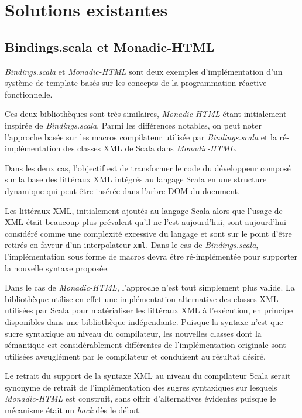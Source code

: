 \section{Solutions existantes}

\subsection{Bindings.scala et Monadic-HTML}

\emph{Bindings.scala} \cite{binding.scala} et \emph{Monadic-HTML} \cite{monadic-html} sont deux exemples d'implémentation d'un système de template basés sur les concepts de la programmation réactive-fonctionnelle.

Ces deux bibliothèques sont très similaires, \emph{Monadic-HTML} étant initialement inspirée de \emph{Bindings.scala}. Parmi les différences notables, on peut noter l'approche basée sur les macros compilateur utilisée par \emph{Bindings.scala} et la ré-implémentation des classes XML de Scala dans \emph{Monadic-HTML}.

Dans les deux cas, l'objectif est de transformer le code du développeur composé sur la base des littéraux XML intégrés au langage Scala en une structure dynamique qui peut être insérée dans l'arbre DOM du document.

Les littéraux XML, initialement ajoutés au langage Scala alors que l'usage de XML était beaucoup plus prévalent qu'il ne l'est aujourd'hui, sont aujourd'hui considéré comme une complexité excessive du langage et sont sur le point d'être retirés en faveur d'un interpolateur \texttt{xml}. Dans le cas de \emph{Bindings.scala}, l'implémentation sous forme de macros devra être ré-implémentée pour supporter la nouvelle syntaxe proposée.

Dans le cas de \emph{Monadic-HTML}, l'approche n'est tout simplement plus valide. La bibliothèque utilise en effet une implémentation alternative des classes XML utilisées par Scala pour matérialiser les littéraux XML à l'exécution, en principe disponibles dans une bibliothèque indépendante. Puisque la syntaxe n'est que sucre syntaxique au niveau du compilateur, les nouvelles classes dont la sémantique est considérablement différentes de l'implémentation originale sont utilisées aveuglément par le compilateur et conduisent au résultat désiré.

Le retrait du support de la syntaxe XML au niveau du compilateur Scala serait synonyme de retrait de l'implémentation des sugres syntaxiques sur lesquels  \emph{Monadic-HTML} est construit, sans offrir d'alternatives évidentes puisque le mécanisme était un \emph{hack} dès le début.

